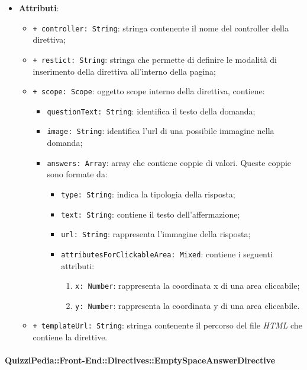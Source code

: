 \begin{itemize}
\begin{itemize}
			\end{itemize}
			\item \textbf{Attributi}: 
				\begin{itemize}
					\item \texttt{+ controller: String}: stringa contenente il nome del controller della direttiva;
					\item \texttt{+ restict: String}: stringa che permette di definire le modalità di inserimento della direttiva all'interno della pagina;
					\item \texttt{+ scope: Scope}: oggetto scope interno della direttiva, contiene:
					\begin{itemize}	
						\item \texttt{questionText: String}: identifica il testo della domanda;
						\item \texttt{image: String}: identifica l'url di una possibile immagine nella domanda;
						\item \texttt{answers: Array}: array che contiene coppie di valori. Queste coppie sono formate da:
						\begin{itemize}
							\item \texttt{type: String}: indica la tipologia della risposta;
							\item \texttt{text: String}: contiene il testo dell'affermazione;
							\item \texttt{url: String}: rappresenta l'immagine della risposta;
							\item \texttt{attributesForClickableArea: Mixed}: contiene i seguenti attributi:
							\begin{enumerate}
								\item \texttt{x: Number}: rappresenta la coordinata x di una area cliccabile;
								\item \texttt{y: Number}: rappresenta la coordinata y di una area cliccabile.
							\end{enumerate}
						\end{itemize}
					\end{itemize}
					\item \texttt{+ templateUrl: String}: stringa contenente il percorso del file \textit{HTML} che contiene la direttive.
				
				\end{itemize}
		\end{itemize}
	
		\paragraph{QuizziPedia::Front-End::Directives::EmptySpaceAnswerDirective}
		
